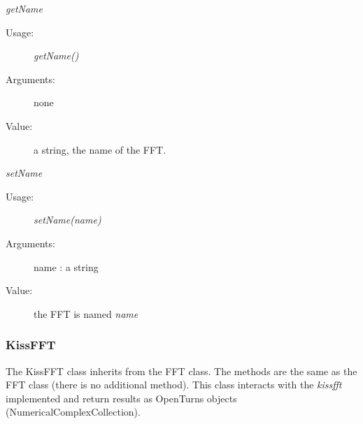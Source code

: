 \begin{description}
\begin{description}
\item \textit{getName}
\begin{description}
\item[Usage:] \textit{getName()}
\item[Arguments:] none
\item[Value:] a string, the name of the FFT.
\end{description}
\bigskip

\item \textit{setName}
\begin{description}
\item[Usage:] \textit{setName(name)}
\item[Arguments:] name : a string
\item[Value:] the FFT is named \textit{name}
\end{description}
\bigskip

\end{description}
\end{description}




\newpage
\subsubsection{KissFFT}
The KissFFT class inherits from the FFT class. The methods are the same as the FFT class (there is no additional method).
This class interacts with the \emph{kissfft} implemented and return results as OpenTurns objects (NumericalComplexCollection).
